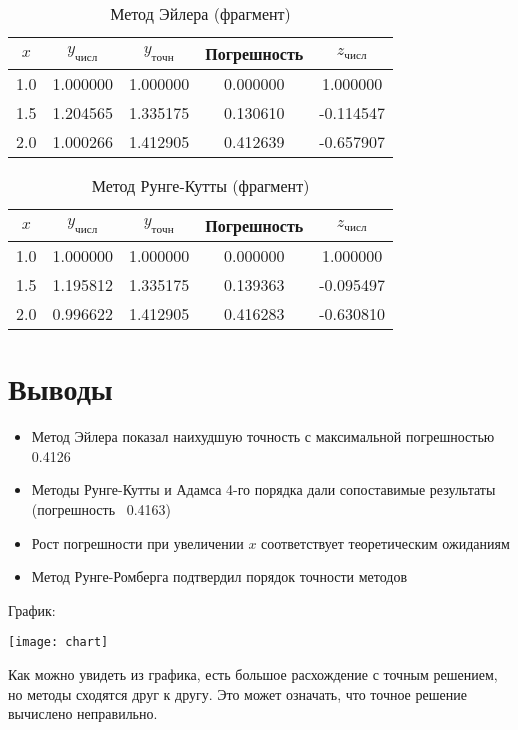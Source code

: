 \begin{table}[h]
\centering
\caption{Метод Эйлера (фрагмент)}
\begin{tabular}{ccccc}
\toprule
$x$ & $y_{числ}$ & $y_{точн}$ & Погрешность & $z_{числ}$ \\
\midrule
1.0 & 1.000000 & 1.000000 & 0.000000 & 1.000000 \\
1.5 & 1.204565 & 1.335175 & 0.130610 & -0.114547 \\
2.0 & 1.000266 & 1.412905 & 0.412639 & -0.657907 \\
\bottomrule
\end{tabular}
\end{table}

\begin{table}[h]
\centering
\caption{Метод Рунге-Кутты (фрагмент)}
\begin{tabular}{ccccc}
\toprule
$x$ & $y_{числ}$ & $y_{точн}$ & Погрешность & $z_{числ}$ \\
\midrule
1.0 & 1.000000 & 1.000000 & 0.000000 & 1.000000 \\
1.5 & 1.195812 & 1.335175 & 0.139363 & -0.095497 \\
2.0 & 0.996622 & 1.412905 & 0.416283 & -0.630810 \\
\bottomrule
\end{tabular}
\end{table}

\section*{Выводы}

\begin{itemize}
\item Метод Эйлера показал наихудшую точность с максимальной погрешностью 0.4126
\item Методы Рунге-Кутты и Адамса 4-го порядка дали сопоставимые результаты (погрешность ~0.4163)
\item Рост погрешности при увеличении $x$ соответствует теоретическим ожиданиям
\item Метод Рунге-Ромберга подтвердил порядок точности методов
\end{itemize}

График:

\texttt{[image: chart]}

Как можно увидеть из графика, есть большое расхождение с точным решением, но методы сходятся друг к другу.
Это может означать, что точное решение вычислено неправильно.

\pagebreak
